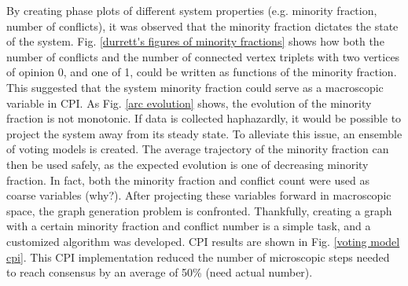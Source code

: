 \documentclass[11pt]{article}
\begin{document}
By creating phase plots of different system properties (e.g. minority fraction, number of conflicts), it was observed that the minority fraction dictates the state of the system. Fig. \ref{durrett's figures of minority fractions} shows how both the number of conflicts and the number of connected vertex triplets with two vertices of opinion 0, and one of 1, could be written as functions of the minority fraction. This suggested that the system minority fraction could serve as a macroscopic variable in CPI. As Fig. \ref{arc evolution} shows, the evolution of the minority fraction is not monotonic. If data is collected haphazardly, it would be possible to project the system away from its steady state. To alleviate this issue, an ensemble of voting models is created. The average trajectory of the minority fraction can then be used safely, as the expected evolution is one of decreasing minority fraction. In fact, both the minority fraction and conflict count were used as coarse variables (why?). After projecting these variables forward in macroscopic space, the graph generation problem is confronted. Thankfully, creating a graph with a certain minority fraction and conflict number is a simple task, and a customized algorithm was developed. CPI results are shown in Fig. \ref{voting model cpi}. This CPI implementation reduced the number of microscopic steps needed to reach consensus by an average of 50\% (need actual number).
\end{document}
